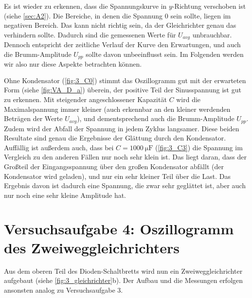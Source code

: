 Es ist wieder zu erkennen, dass die Spannungskurve in $y$-Richtung verschoben ist (siehe \ref{sec:A2}).
Die Bereiche, in denen die Spannung 0 sein sollte, liegen im negativen Bereich.
Das kann nicht richtig sein, da der Gleichrichter genau das verhindern sollte.
Dadurch sind die gemessenen Werte für $U_{avg}$ unbrauchbar.
Dennoch entspricht der zeitliche Verlauf der Kurve den Erwartungen, und auch die Brumm-Amplitude $U_{pp}$ sollte davon unbeeinflusst sein.
Im Folgenden werden wir also nur diese Aspekte betrachten können.

Ohne Kondensator (\ref{fig:3_C0}) stimmt das Oszillogramm gut mit der erwarteten Form (siehe \ref{fig:VA_D_a}) überein, 
der positive Teil der Sinusspannung ist gut zu erkennen.
Mit steigender angeschlossener Kapazität $C$ wird die Maximalspannung immer kleiner (auch erkennbar an den kleiner werdenden Beträgen der Werte $U_{avg}$), 
und dementsprechend auch die Brumm-Amplitude $U_{pp}$.
Zudem wird der Abfall der Spannung in jedem Zyklus langsamer.
Diese beiden Resultate sind genau die Ergebnisse der Glättung durch den Kondensator.
Auffällig ist außerdem auch, dass bei $C=\SI{1000}{\micro\farad}$ (\ref{fig:3_C3}) die Spannung im Vergleich zu den anderen Fällen nur noch sehr klein ist.
Das liegt daran, dass der Großteil der Eingangsspannung über den großen Kondensator abfällt (der Kondensator wird geladen), und nur ein sehr kleiner Teil über die Last.
Das Ergebnis davon ist dadurch eine Spannung, die zwar sehr geglättet ist, aber auch nur noch eine sehr kleine Amplitude hat.


\section{Versuchsaufgabe 4: Oszillogramm des Zweiweggleichrichters}

Aus dem oberen Teil des Dioden-Schaltbretts wird nun ein Zweiweggleichrichter aufgebaut (siehe \ref{fig:3_gleichrichter}b).
Der Aufbau und die Messungen erfolgen ansonsten analog zu Versuchsaufgabe 3.

